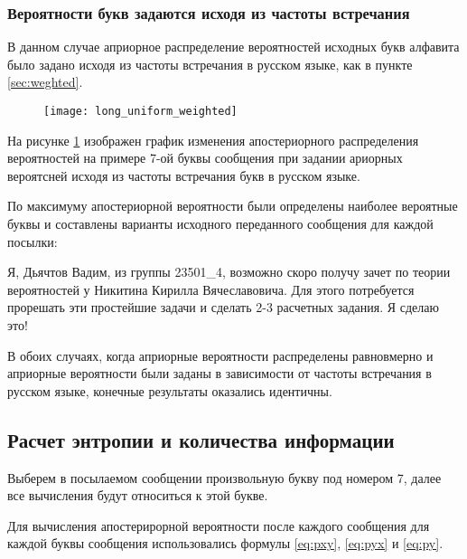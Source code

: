 \subsubsection{Вероятности букв задаются исходя из частоты встречания}

В данном случае априорное распределение вероятностей исходных букв алфавита было задано исходя из частоты встречания в русском языке, как в пункте \ref{sec:weghted}.

\begin{figure}[H]
\begin{center}
	\vspace{-0.9cm}
	\texttt{[image: long\_uniform\_weighted]}
	\caption{}
	\label{plt:long_uniform_weighted}
	\vspace{-0.5cm}
\end{center}
\end{figure}

На рисунке \ref{plt:long_uniform_weighted} изображен график изменения апостериорного распределения вероятностей на примере 7-ой буквы сообщения при задании ариорных вероятсней исходя из частоты встречания букв в русском языке.

По максимуму апостериорной вероятности были определены наиболее вероятные буквы и составлены варианты исходного переданного сообщения для каждой посылки:

\vspace{0.5cm}
{ \scriptsize

Я, Дьячтов Вадим, из группы 23501\_4, возможно скоро получу зачет по теории вероятностей у Никитина Кирилла Вячеславовича. Для этого потребуется прорешать эти простейшие задачи и сделать 2-3 расчетных задания. Я сделаю это!

}
\vspace{0.5cm}

В обоих случаях, когда априорные вероятности распределены равновмерно и априорные вероятности были заданы в зависимости от частоты встречания в русском языке, конечные результаты оказались идентичны.

\subsection{Расчет энтропии и количества информации}

Выберем в посылаемом сообщении произвольную букву под номером 7, далее все вычисления будут относиться к этой букве.

Для вычисления апостерирорной вероятности после каждого сообщения для каждой буквы сообщения использовались формулы \ref{eq:pxy}, \ref{eq:pyx} и \ref{eq:py}.

